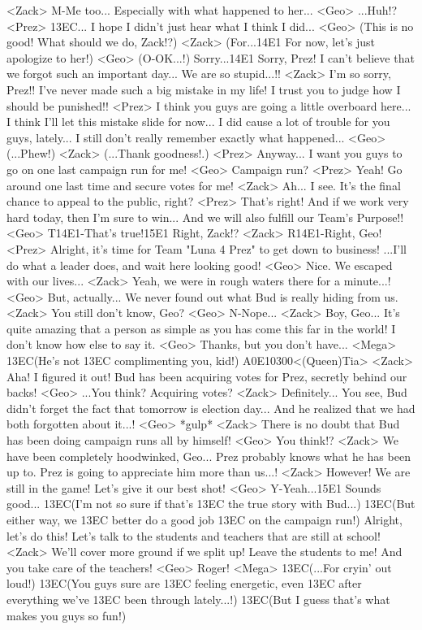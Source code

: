 <Zack> M-Me too... 
Especially with what happened to her... 
<Geo> ...Huh!? 
<Prez> {13}{EC}... 
I hope I didn't just hear what I think I did... 
<Geo> (This is no good!  What should we do, Zack!?) 
<Zack> (For...{14}{E1} For now, let's  just apologize to her!) 
<Geo> (O-OK...!) 
Sorry...{14}{E1} Sorry, Prez! 
I can't believe that we forgot such an important day... 
We are so stupid...!! 
<Zack> I'm so sorry, Prez!! 
I've never made such a big mistake in my life! 
I trust you to judge how I should be punished!! 
<Prez> I think you guys are going a little overboard here... 
I think I'll let this mistake slide for now... 
I did cause a lot of trouble for you guys, lately... 
I still don't really remember exactly what happened... 
<Geo> (...Phew!) 
<Zack> (...Thank goodness!.) 
<Prez> Anyway... 
I want you guys to go on one last campaign run for me! 
<Geo> Campaign run? 
<Prez> Yeah! Go around one last time and secure votes for me! 
<Zack> Ah... I see. 
It's the final chance to appeal to the public, right? 
<Prez> That's right! 
And if we work very hard today, then I'm sure to win... 
And we will also fulfill our Team's Purpose!! 
<Geo> T{14}{E1}-That's true!{15}{E1} Right, Zack!? 
<Zack> R{14}{E1}-Right, Geo! 
<Prez> Alright, it's time for Team "Luna 4 Prez" to get down to business! 
...I'll do what a leader does, and wait here looking good! 
<Geo> Nice. We escaped with our lives... 
<Zack> Yeah, we were in rough waters there for a minute...! 
<Geo> But, actually... 
We never found out what Bud is really hiding from us. 
<Zack> You still don't know, Geo? 
<Geo> N-Nope... 
<Zack> Boy, Geo... 
It's quite amazing that a person as simple as you has come this far in the world! 
I don't know how else to say it. 
<Geo> Thanks, but you don't have... 
<Mega> {13}{EC}(He's not {13}{EC} complimenting you, kid!) 
{A0}{E1}{03}{00}<(Queen)Tia> 
<Zack> Aha! I figured it out! 
Bud has been acquiring votes for Prez, secretly behind our backs! 
<Geo> ...You think? Acquiring votes? 
<Zack> Definitely... 
You see, Bud didn't forget the fact that tomorrow is election day... 
And he realized that we had both forgotten about it...! 
<Geo> *gulp* 
<Zack> There is no doubt that Bud has been doing campaign runs all by himself! 
<Geo> You think!? 
<Zack> We have been completely hoodwinked, Geo... 
Prez probably knows what he has been up to. 
Prez is going to appreciate him more than us...! 
<Zack> However! 
We are still in the game! 
Let's give it our best shot! 
<Geo> Y-Yeah...{15}{E1} Sounds good... 
{13}{EC}(I'm not so sure if that's {13}{EC} the true story with Bud...) 
{13}{EC}(But either way, we {13}{EC} better do a good job {13}{EC} on the campaign run!) 
Alright, let's do this! 
Let's talk to the students and teachers that are still at school! 
<Zack> We'll cover more ground if we split up! 
Leave the students to me! 
And you take care of the teachers! 
<Geo> Roger! 
<Mega> {13}{EC}(...For cryin' out loud!) 
{13}{EC}(You guys sure are {13}{EC} feeling energetic, even 
{13}{EC} after everything we've {13}{EC} been through lately...!) 
{13}{EC}(But I guess that's what  makes you guys so fun!) 
